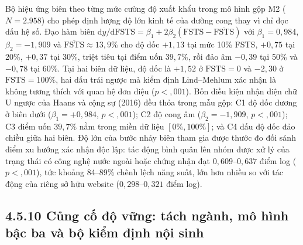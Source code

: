 \documentclass[
  a4paper,
  13pt]{extreport}
\begin{document}
Bộ hiệu ứng biên theo từng mức cường độ xuất khẩu trong mô hình gộp M2
(\(N = 2.958\)) cho phép định lượng độ lớn kinh tế của đường cong thay
vì chỉ đọc dấu hệ số. Đạo hàm biên
\(\mathrm{d}y/\mathrm{d}\mathrm{FSTS} = \beta_1 + 2\beta_2(\mathrm{FSTS} - \overline{\mathrm{FSTS}})\)
với \(\beta_1 = 0{,}984\), \(\beta_2 = -1{,}909\) và
\(\overline{\mathrm{FSTS}} \approx 13{,}9\%\) cho độ dốc \(+1{,}13\) tại
mức 10\% FSTS, \(+0{,}75\) tại 20\%, \(+0{,}37\) tại 30\%, triệt tiêu
tại điểm uốn \(39{,}7\%\), rồi đảo âm \(-0{,}39\) tại 50\% và
\(-0{,}78\) tại 60\%. Tại hai biên dữ liệu, độ dốc là \(+1{,}52\) ở
\(\mathrm{FSTS} = 0\) và \(-2{,}30\) ở \(\mathrm{FSTS} = 100\%\), hai
dấu trái ngược mà kiểm định Lind--Mehlum xác nhận là không tương thích
với quan hệ đơn điệu (\(p < {,}001\)). Bốn điều kiện nhận diện chữ U
ngược của Haans và cộng sự (2016) đều thỏa trong mẫu gộp: C1 độ dốc
dương ở biên dưới (\(\beta_1 = +0{,}984\), \(p < {,}001\)); C2 độ cong
âm (\(\beta_2 = -1{,}909\), \(p < {,}001\)); C3 điểm uốn \(39{,}7\%\)
nằm trong miền dữ liệu \([0\%, 100\%]\); và C4 dấu độ dốc đảo chiều giữa
hai biên. Độ lớn của bước nhảy biên tham gia được thước đo đối sánh điểm
xu hướng xác nhận độc lập: tác động bình quân lên nhóm được xử lý của
trạng thái có công nghệ nước ngoài hoặc chứng nhận đạt
\(0{,}609\)--\(0{,}637\) điểm log (\(p < {,}001\)), tức khoảng 84--89\%
chênh lệch năng suất, lớn hơn nhiều so với tác động của riêng sở hữu
website (\(0{,}298\)--\(0{,}321\) điểm log).

\hypertarget{cux1ee7ng-cux1ed1-ux111ux1ed9-vux1eefng-tuxe1ch-nguxe0nh-muxf4-huxecnh-bux1eadc-ba-vuxe0-bux1ed9-kiux1ec3m-ux111ux1ecbnh-nux1ed9i-sinh}{%
\subsection{4.5.10 Củng cố độ vững: tách ngành, mô hình bậc ba và bộ
kiểm định nội
sinh}\label{cux1ee7ng-cux1ed1-ux111ux1ed9-vux1eefng-tuxe1ch-nguxe0nh-muxf4-huxecnh-bux1eadc-ba-vuxe0-bux1ed9-kiux1ec3m-ux111ux1ecbnh-nux1ed9i-sinh}}
\end{document}
